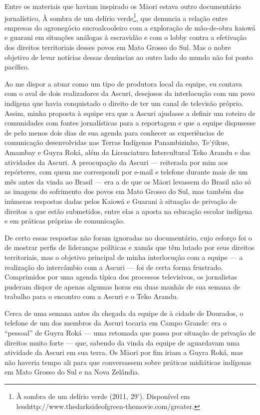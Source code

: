 Entre os materiais que haviam inspirado os M\=aori estava outro
documentário jornalístico, À sombra de um delírio verde\footnote{À
sombra de um delírio verde (2011, 29’). Disponível em
{less}http://www.thedarksideofgreen-themovie.com/{greater}.},
que denuncia a relação entre empresas do agronegócio sucroalcooleiro
com a exploração de mão-de-obra kaiowá e guarani em situações análogas
à escravidão e com o lobby contra a efetivação dos direitos
territoriais desses povos em Mato Grosso do Sul. Mas o nobre objetivo
de levar notícias dessas denúncias ao outro lado do mundo não foi ponto
pacífico.

Ao me dispor a atuar como um tipo de produtora local da equipe, eu
contava com o aval de dois realizadores da Ascuri, desejosos da
interlocução com um povo indígena que havia conquistado o direito de
ter um canal de televisão próprio. Assim, minha proposta à equipe era
que a Ascuri ajudasse a definir um roteiro de comunidades com fontes
jornalísticas para a reportagem e que a equipe dispusesse de pelo menos
dois dias de sua agenda para conhecer as experiências de comunicação
desenvolvidas nas Terras Indígenas Panambizinho, Te’ýikue, Amambay e
Guyra Roká, além da Licenciatura Intercultural Teko Arandu e das
atividades da Ascuri. A preocupação da Ascuri --- reiterada por mim aos
repórteres, com quem me correspondi por e-mail e telefone durante mais
de um mês antes da vinda ao Brasil --- era a de que os M\=aori levassem
do Brasil não só as imagens do sofrimento dos povos em Mato Grosso do
Sul, mas também das inúmeras respostas dadas pelos Kaiowá e Guarani à
situação de privação de direitos a que estão submetidos, entre elas a
aposta na educação escolar indígena e em práticas próprias de
comunicação. 

De certo essas respostas não foram ignoradas no documentário, cujo
esforço foi o de mostrar perfis de lideranças políticas e xamãs que têm
lutado por seus direitos territoriais, mas o objetivo principal de
minha interlocução com a equipe --- a realização do intercâmbio com a
Ascuri --- foi de certa forma frustrado. Comprimidos por uma agenda
típica dos processos televisivos, os jornalistas puderam dispor de
apenas algumas horas em duas manhãs de sua semana de trabalho para o
encontro com a Ascuri e o Teko Arandu.

Cerca de uma semana antes da chegada da equipe de  à cidade de
Dourados, o telefone de um dos membros da Ascuri tocaria em Campo
Grande: era o ``pessoal'' de Guyra Roká --- uma retomada que passa por
situação de privação de direitos muito forte --- que, sabendo da vinda da
equipe de  aguardavam uma atividade da Ascuri em sua terra. Os
M\=aori por fim iriam a Guyra Roká, mas não haveria tempo ali para que
conversassem sobre práticas midiáticas indígenas em Mato Grosso do Sul
e na Nova Zelândia. 

